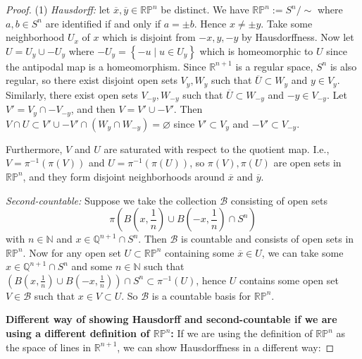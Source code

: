 \documentclass[reqno]{amsart}
\theoremstyle{definition}
\theoremstyle{remark}
\begin{document}
\begin{proof}
    (1) \textit{Hausdorff:} let $\overline{x},\overline{y}
    \in \mathbb{R}\mathbb{P}^{n}$ be distinct. We have
    $\mathbb{R}\mathbb{P}^{n} := S^{n} / \sim$ where
    $a,b \in S^{n}$ are identified if and only if
    $a = \pm b$. Hence
    $x \neq \pm y$. Take some
    neighborhood $U_x$ of $x$ which is disjoint from
    $-x,y,-y$ by Hausdorffness. Now
    let $U = U_y \cup -U_y$ where
    $-U_y = \left\{ -u  \mid u \in U_y \right\} $ which
    is homeomorphic to $U$ since the antipodal map is
    a homeomorphism. Since
    $ \mathbb{R}^{n+1}$ is a regular space,
    $S^{n}$ is also regular, so there exist 
    disjoint open sets $V_y,W_y$ such that
    $\overline{U}\subset W_y$ and $y \in V_y$.
    Similarly, there exist open sets
    $V_{-y}, W_{-y}$ such that
    $\overline{U} \subset W_{-y}$ and
    $-y \in V_{-y}$. Let
    $V' = V_y \cap -V_{-y}$, and then
    $V = V' \cup -V'$. Then
    $V \cap U \subset  V' \cup -V'
    \cap \left( W_{y} \cap W_{-y} \right) 
    = \varnothing$
    since $V' \subset V_y$ and
    $-V' \subset V_{-y}$.

    Furthermore, $V$ and $U$ are saturated with respect to
    the quotient map. I.e.,
    $V = \pi^{-1}\left( \pi(V) \right) $ and
    $U = \pi^{-1}\left( \pi(U) \right) $, so
    $\pi(V),\pi(U)$ are open sets in $\mathbb{R}\mathbb{P}^{n}$,
    and they form disjoint neighborhoods around
    $\overline{x}$ and $\overline{y}$.

    \textit{Second-countable:} Suppose
    we take the collection
    $\mathcal{B}$ consisting of
    open sets 
    \[
        \pi \left( B(x,\frac{1}{n}) \cup 
    B\left( -x, \frac{1}{n} \right) \cap S^{n} \right)
\]
with
    $n \in \mathbb{N} $ and $
    x \in \mathbb{Q}^{n+1} \cap S^{n}$. Then 
    $\mathcal{B}$ is countable and consists of
    open sets in $\mathbb{R}\mathbb{P}^{n}$. Now for
    any open set $U \subset \mathbb{R}\mathbb{P}^{n}$ containing
    some $\overline{x} \in U$, we can take
    some
    $x \in \mathbb{Q}^{n+1} \cap S^{n}$ and some
    $n \in \mathbb{N} $ such that
    $ \left( B\left( x,\frac{1}{n} \right) 
    \cup B\left( -x, \frac{1}{n} \right) \right)
    \cap S^{n} \subset 
    \pi^{-1}(U)$, hence
    $U$ contains some open set $V \in \mathcal{B}$ such that
    $x \in V \subset U$. So $\mathcal{B}$ is a countable
    basis for $\mathbb{R}\mathbb{P}^{n}$.


    \textbf{Different way of showing Hausdorff and
    second-countable if we are using a different
definition of $\mathbb{R}\mathbb{P}^{n}$:}
If we are using the definition of
$\mathbb{R}\mathbb{P}^{n}$ as the space of lines
in $\mathbb{R}^{n+1}$, we can show Hausdorffness
in a different way:


\end{proof}
\end{document}
